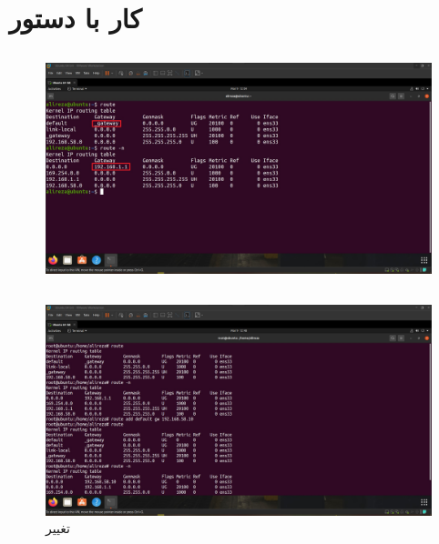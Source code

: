 \documentclass{article}
\begin{document}
\section{کار با دستور }
\subsection{}
\begin{figure}[H]
    \centering
    \includegraphics[width=1.0\textwidth]{figures/8a.jpg}
    \caption
	{
	}
    \label{fig:fig1}
\end{figure}

\subsection{}
\begin{figure}[H]
    \centering
    \includegraphics[width=1.0\textwidth]{figures/8b.jpg}
    \caption
	{
تغییر 
	}
    \label{fig:fig1}
\end{figure}
\end{document}
